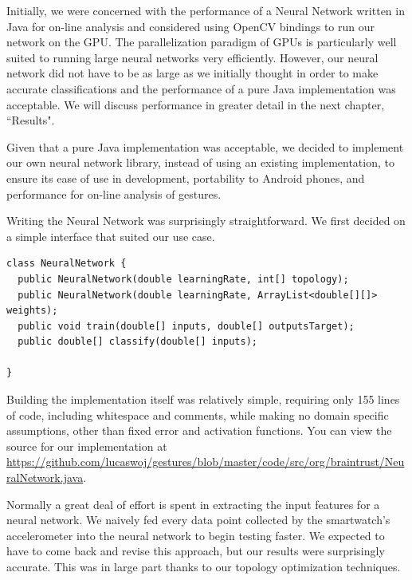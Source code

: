 \documentclass{report}
\begin{document}
Initially, we were concerned with the performance of a Neural Network written in Java for on-line analysis and considered using OpenCV bindings to run our network on the GPU. The parallelization paradigm of GPUs is particularly well suited to running large neural networks very efficiently. However, our neural network did not have to be as large as we initially thought in order to make accurate classifications and the performance of a pure Java implementation was acceptable. We will discuss performance in greater detail in the next chapter, ``Results".

Given that a pure Java implementation was acceptable, we decided to implement our own neural network library, instead of using an existing implementation, to ensure its ease of use in development, portability to Android phones, and performance for on-line analysis of gestures.

Writing the Neural Network was surprisingly straightforward. We first decided on a simple interface that suited our use case.
\begin{verbatim}
class NeuralNetwork {
  public NeuralNetwork(double learningRate, int[] topology);
  public NeuralNetwork(double learningRate, ArrayList<double[][]> weights);
  public void train(double[] inputs, double[] outputsTarget);
  public double[] classify(double[] inputs);

}
\end{verbatim}
Building the implementation itself was relatively simple, requiring only 155 lines of code, including whitespace and comments, while making no domain specific assumptions, other than fixed error and activation functions. You can view the source for our implementation at \url{https://github.com/lucaswoj/gestures/blob/master/code/src/org/braintrust/NeuralNetwork.java}.

Normally a great deal of effort is spent in extracting the input features for a neural network. We naively fed every data point collected by the smartwatch's accelerometer into the neural network to begin testing faster. We expected to have to come back and revise this approach, but our results were surprisingly accurate. This was in large part thanks to our topology optimization techniques.
\end{document}
